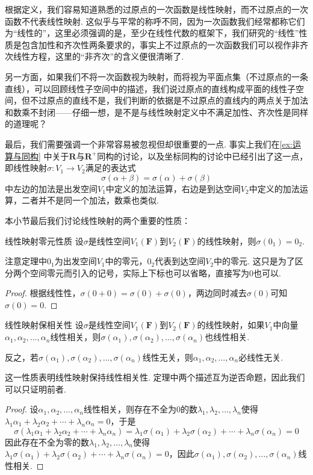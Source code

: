 根据定义，我们容易知道熟悉的过原点的一次函数是线性映射，而不过原点的一次函数不代表线性映射. 这似乎与平常的称呼不同，因为一次函数我们经常都称它们为``线性的''，这里必须强调的是，至少在线性代数的框架下，我们研究的``线性''性质是包含加性和齐次性两条要求的，事实上不过原点的一次函数我们可以视作非齐次线性方程，这里的``非齐次''的含义便很清晰了.

另一方面，如果我们不将一次函数视为映射，而将视为平面点集（不过原点的一条直线），可以回顾线性子空间中的描述，我们说过原点的直线构成平面的线性子空间，但不过原点的直线不是，我们判断的依据是不过原点的直线内的两点关于加法和数乘不封闭——仔细一想，是不是与线性映射定义中不满足加性、齐次性是同样的道理呢？

最后，我们需要强调一个非常容易被忽视但却很重要的一点. 事实上我们在\autoref{ex:运算与同构} 中关于$\mathbf{R}$与$\mathbf{R}^+$同构的讨论，以及坐标同构的讨论中已经引出了这一点，即线性映射$\sigma:V_1\to V_2$满足的表达式
\[\sigma(\alpha+\beta)=\sigma(\alpha)+\sigma(\beta)\]
中左边的加法是出发空间$V_1$中定义的加法运算，右边是到达空间$V_2$中定义的加法运算，二者并不是同一个加法，数乘也类似. %

本小节最后我们讨论线性映射的两个重要的性质：
\begin{theorem}{}{线性映射零元性质}
    设$\sigma$是线性空间$V_1(\mathbf{F})$到$V_2(\mathbf{F})$的线性映射，则$\sigma(0_1)=0_2$.
\end{theorem}
注意定理中$0_1$为出发空间$V_1$中的零元，$0_2$代表到达空间$V_2$中的零元. 这只是为了区分两个空间零元而引入的记号，实际上下标也可以省略，直接写为0也可以.

\begin{proof}
    根据线性性，$\sigma(0+0)=\sigma(0)+\sigma(0)$，两边同时减去$\sigma(0)$可知$\sigma(0)=0$.
\end{proof}

\begin{theorem}{}{线性映射保相关性}
    设$\sigma$是线性空间$V_1(\mathbf{F})$到$V_2(\mathbf{F})$的线性映射，如果$V_1$中向量$\alpha_1,\alpha_2,\ldots,\alpha_n$线性相关，则$\sigma(\alpha_1),\sigma(\alpha_2),\ldots,\sigma(\alpha_n)$也线性相关.

    反之，若$\sigma(\alpha_1),\sigma(\alpha_2),\ldots,\sigma(\alpha_n)$线性无关，则$\alpha_1,\alpha_2,\ldots,\alpha_n$必线性无关.
\end{theorem}
这一性质表明线性映射保持线性相关性. 定理中两个描述互为逆否命题，因此我们可以只证明前者.

\begin{proof}
    设$\alpha_1,\alpha_2,\ldots,\alpha_n$线性相关，则存在不全为0的数$\lambda_1,\lambda_2,\ldots,\lambda_n$使得$\lambda_1\alpha_1+\lambda_2\alpha_2+\cdots+\lambda_n\alpha_n=0$，于是
    \[\sigma(\lambda_1\alpha_1+\lambda_2\alpha_2+\cdots+\lambda_n\alpha_n)=\lambda_1\sigma(\alpha_1)+\lambda_2\sigma(\alpha_2)+\cdots+\lambda_n\sigma(\alpha_n)=0\]
    因此存在不全为零的数$\lambda_1,\lambda_2,\ldots,\lambda_n$使得$\lambda_1\sigma(\alpha_1)+\lambda_2\sigma(\alpha_2)+\cdots+\lambda_n\sigma(\alpha_n)=0$，因此$\sigma(\alpha_1),\sigma(\alpha_2),\ldots,\sigma(\alpha_n)$线性相关.
\end{proof}

